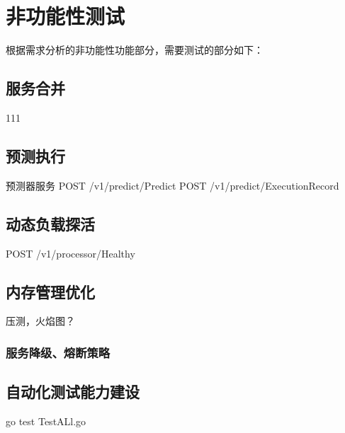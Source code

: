 \section{非功能性测试}

根据需求分析的非功能性功能部分，需要测试的部分如下：

\subsection{服务合并}
111
%
%
%
%
%

\subsection{预测执行}

预测器服务
POST /v1/predict/Predict
POST /v1/predict/ExecutionRecord

\subsection{动态负载探活}
POST /v1/processor/Healthy

\subsection{内存管理优化}
压测，火焰图？

\subsubsection{服务降级、熔断策略}


\subsection{自动化测试能力建设}
go test TestALl.go


